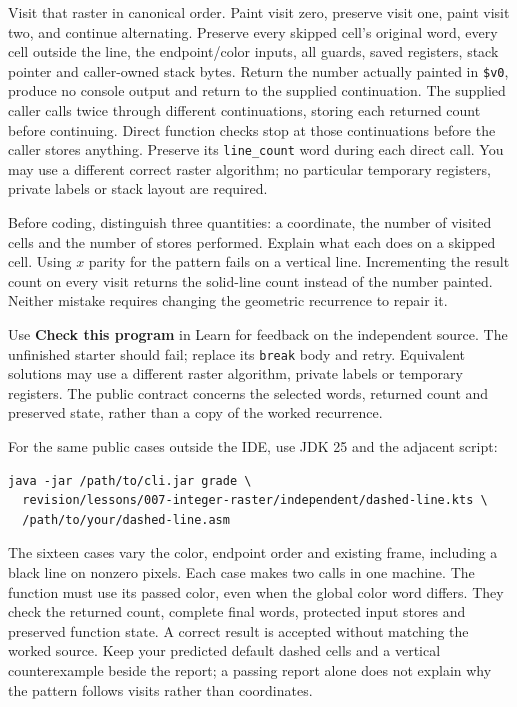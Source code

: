Visit that raster in canonical order. Paint visit zero, preserve visit one, paint
visit two, and continue alternating. Preserve every skipped cell's original word,
every cell outside the line, the endpoint/color inputs, all guards, saved registers,
stack pointer and caller-owned stack bytes. Return the number actually painted in
\texttt{\$v0}, produce no console output and return to the supplied continuation.
The supplied caller calls twice through different continuations, storing each
returned count before continuing. Direct function checks stop at those
continuations before the caller stores anything. Preserve its \texttt{line\_count}
word during each direct call. You may use a different correct raster
algorithm; no particular temporary registers, private labels or stack layout are
required.

Before coding, distinguish three quantities: a coordinate, the number of visited
cells and the number of stores performed. Explain what each does on a skipped
cell. Using $x$ parity for the pattern fails on a vertical line. Incrementing the
result count on every visit returns the solid-line count instead of the number
painted. Neither mistake requires changing the geometric recurrence to repair it.

Use \textbf{Check this program} in Learn for feedback on the independent source.
The unfinished starter should fail; replace its \texttt{break} body and retry.
Equivalent solutions may use a different raster algorithm, private labels or
temporary registers. The public contract concerns the selected words, returned
count and preserved state, rather than a copy of the worked recurrence.

For the same public cases outside the IDE, use JDK 25 and the adjacent script:
\begin{verbatim}
java -jar /path/to/cli.jar grade \
  revision/lessons/007-integer-raster/independent/dashed-line.kts \
  /path/to/your/dashed-line.asm
\end{verbatim}
The sixteen cases vary the color, endpoint order and existing frame, including a
black line on nonzero pixels. Each case makes two calls in one machine. The
function must use its passed color, even when the global color word differs. They check the returned count, complete final words, protected
input stores and preserved function state. A correct result is accepted without
matching the worked source. Keep your predicted default dashed cells and a vertical
counterexample beside the report; a passing report alone does not explain why the
pattern follows visits rather than coordinates.


